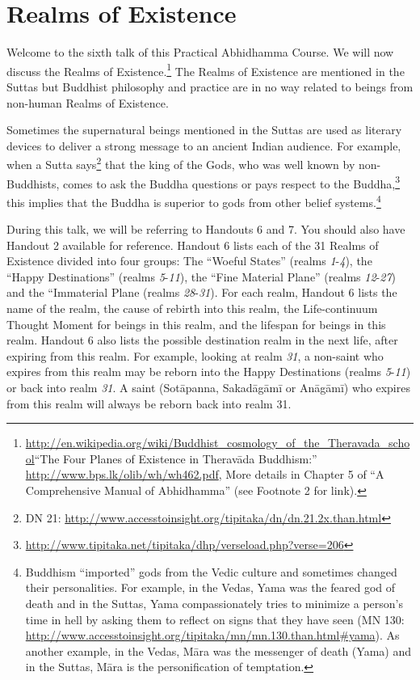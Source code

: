 \section{Realms of Existence}

Welcome to the sixth talk of this Practical Abhidhamma Course. We will now discuss the Realms of Existence.\footnote{\url{http://en.wikipedia.org/wiki/Buddhist_cosmology_of_the_Theravada_school}\linebreak “The Four Planes of Existence in Theravāda Buddhism:” \url{http://www.bps.lk/olib/wh/wh462.pdf}, More details in Chapter 5 of “A Comprehensive Manual of Abhidhamma” (see Footnote 2 for link).} The Realms of Existence are mentioned in the Suttas but Buddhist philosophy and practice are in no way related to beings from non-human Realms of Existence. 

Sometimes the supernatural beings mentioned in the Suttas are used as literary devices to deliver a strong message to an ancient Indian audience. For example, when a Sutta says\footnote{DN 21: \url{http://www.accesstoinsight.org/tipitaka/dn/dn.21.2x.than.html}} that the king of the Gods, who was well known by non-Buddhists, comes to ask the Buddha questions or pays respect to the Buddha,\footnote{\url{http://www.tipitaka.net/tipitaka/dhp/verseload.php?verse=206}} this implies that the Buddha is superior to gods from other belief systems.\footnote{Buddhism “imported” gods from the Vedic culture and sometimes changed their personalities. For example, in the Vedas, Yama was the feared god of death and in the Suttas, Yama compassionately tries to minimize a person’s time in hell by asking them to reflect on signs that they have seen (MN 130: \url{http://www.accesstoinsight.org/tipitaka/mn/mn.130.than.html\#yama}). As another example, in the Vedas, Māra was the messenger of death (Yama) and in the Suttas, Māra is the personification of temptation.}

During this talk, we will be referring to Handouts 6 and 7. You should also have Handout 2 available for reference. Handout 6 lists each of the 31 Realms of Existence divided into four groups: The “Woeful States” (realms \textit{1}-\textit{4}), the “Happy Destinations” (realms \textit{5}-\textit{11}), the “Fine Material Plane” (realms \textit{12}-\textit{27}) and the “Immaterial Plane (realms \textit{28}-\textit{31}). For each realm, Handout 6 lists the name of the realm, the cause of rebirth into this realm, the Life-continuum Thought Moment for beings in this realm, and the lifespan for beings in this realm. Handout 6 also lists the possible destination realm in the next life, after expiring from this realm. For example, looking at realm \textit{31}, a non-saint who expires from this realm may be reborn into the Happy Destinations (realms \textit{5}-\textit{11}) or back into realm \textit{31}. A saint (Sotāpanna, Sakadāgāmī or Anāgāmī) who expires from this realm will always be reborn back into realm 31.

